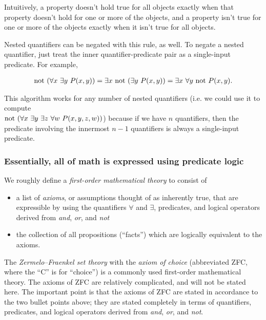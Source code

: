 Intuitively, a property doesn't hold true for all objects exactly when that property doesn't hold for one or more of the objects, and a property isn't true for one or more of the objects exactly when it isn't true for all objects.

Nested quantifiers can be negated with this rule, as well. To negate a nested quantifier, just treat the inner quantifier-predicate pair as a single-input predicate. For example,

\begin{align*}
    \text{not }(\forall x \text{ } \exists y \text{ } P(x, y)) = \exists x \text{ } \text{not } (\exists y \text{ } P(x, y)) = \exists x \text{ } \forall y \text{ } \text{not } P(x, y).
\end{align*}

This algorithm works for any number of nested quantifiers (i.e. we could use it to compute \\ $\text{not }(\forall x \text{ } \exists y \text{ } \exists z \text{ } \forall w \text{ } P(x, y, z, w))$) because if we have $n$ quantifiers, then the predicate involving the innermost $n - 1$ quantifiers is always a single-input predicate.

\subsubsection{Essentially, all of math is expressed using predicate logic}

We roughly define a \textit{first-order mathematical theory} to consist of

\begin{itemize}
    \item a list of \textit{axioms}, or assumptions thought of as inherently true, that are expressible by using the quantifiers $\forall$ and $\exists$, predicates, and logical operators derived from \textit{and}, \textit{or}, and \textit{not}
    \item the collection of all propositions (``facts'') which are logically equivalent to the axioms.
\end{itemize}

The \textit{Zermelo–Fraenkel set theory} with the \textit{axiom of choice} (abbreviated ZFC, where the ``C'' is for ``choice'') is a commonly used first-order mathematical theory. The axioms of ZFC are relatively complicated, and will not be stated here. The important point is that the axioms of ZFC are stated in accordance to the two bullet points above; they are stated completely in terms of quantifiers, predicates, and logical operators derived from \textit{and}, \textit{or}, and \textit{not}.

